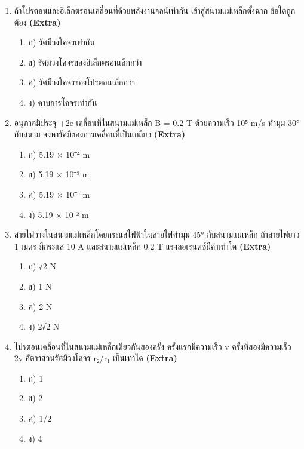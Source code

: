 \documentclass[12pt]{article}
\begin{document}
\begin{enumerate}[label=\arabic*.]
\begin{enumerate}[label=)]
\item ก) 20 MHz
\item ข) 10 MHz
\item ค) 5 MHz
\item ง) 40 MHz
\end{enumerate}
\item ถ้าโปรตอนและอิเล็กตรอนเคลื่อนที่ด้วยพลังงานจลน์เท่ากัน เข้าสู่สนามแม่เหล็กตั้งฉาก ข้อใดถูกต้อง \hfill \textbf{\small (Extra)}
\begin{enumerate}[label=)]
\item ก) รัศมีวงโคจรเท่ากัน
\item ข) รัศมีวงโคจรของอิเล็กตรอนเล็กกว่า
\item ค) รัศมีวงโคจรของโปรตอนเล็กกว่า
\item ง) คาบการโคจรเท่ากัน
\end{enumerate}
\item อนุภาคมีประจุ +2e เคลื่อนที่ในสนามแม่เหล็ก B = 0.2 T ด้วยความเร็ว 10⁵ m/s ทำมุม 30° กับสนาม จงหารัศมีของการเคลื่อนที่เป็นเกลียว \hfill \textbf{\small (Extra)}
\begin{enumerate}[label=)]
\item ก) 5.19 × 10⁻⁴ m
\item ข) 5.19 × 10⁻³ m
\item ค) 5.19 × 10⁻⁵ m
\item ง) 5.19 × 10⁻² m
\end{enumerate}
\item สายไฟวางในสนามแม่เหล็กโดยกระแสไฟฟ้าในสายไฟทำมุม 45° กับสนามแม่เหล็ก ถ้าสายไฟยาว 1 เมตร มีกระแส 10 A และสนามแม่เหล็ก 0.2 T แรงลอเรนตซ์มีค่าเท่าใด \hfill \textbf{\small (Extra)}
\begin{enumerate}[label=)]
\item ก) √2 N
\item ข) 1 N
\item ค) 2 N
\item ง) 2√2 N
\end{enumerate}
\item โปรตอนเคลื่อนที่ในสนามแม่เหล็กเดียวกันสองครั้ง ครั้งแรกมีความเร็ว v ครั้งที่สองมีความเร็ว 2v อัตราส่วนรัศมีวงโคจร r₂/r₁ เป็นเท่าใด \hfill \textbf{\small (Extra)}
\begin{enumerate}[label=)]
\item ก) 1
\item ข) 2
\item ค) 1/2
\item ง) 4
\end{enumerate}

\end{enumerate}
\end{document}
